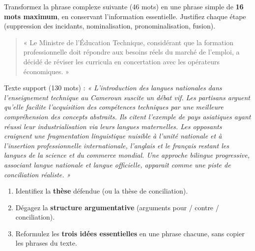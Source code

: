 \documentclass[11pt]{article}
\newcounter{popsec}
\newcounter{popsub}
\newcommand{\courssub}[1]{%
  \stepcounter{popsub}%
  \par\vspace{9pt}\noindent{\popxbold\fontsize{11.5}{13}\selectfont\color{popink}{\color{poporange}\thepopsec.\thepopsub}\hspace{6pt}#1}\par\nopagebreak\vspace{4pt}
}
\begin{document}
\begin{exercice}
Transformez la phrase complexe suivante (46 mots) en une phrase simple de \textbf{16 mots maximum}, en conservant l'information essentielle. Justifiez chaque étape (suppression des incidants, nominalisation, pronominalisation, fusion).

\begin{quote}
« Le Ministre de l'Éducation Technique, considérant que la formation professionnelle doit répondre aux besoins réels du marché de l'emploi, a décidé de réviser les curricula en concertation avec les opérateurs économiques. »
\end{quote}
\end{exercice}

\begin{exercice}
Texte support (130 mots) : \emph{« L'introduction des langues nationales dans l'enseignement technique au Cameroun suscite un débat vif. Les partisans arguent qu'elle facilite l'acquisition des compétences techniques par une meilleure compréhension des concepts abstraits. Ils citent l'exemple de pays asiatiques ayant réussi leur industrialisation via leurs langues maternelles. Les opposants craignent une fragmentation linguistique nuisible à l'unité nationale et à l'insertion professionnelle internationale, l'anglais et le français restant les langues de la science et du commerce mondial. Une approche bilingue progressive, associant langue nationale et langue officielle, apparaît comme une piste de conciliation réaliste. »}

\begin{enumerate}
    \item Identifiez la \textbf{thèse} défendue (ou la thèse de conciliation).
    \item Dégagez la \textbf{structure argumentative} (arguments pour / contre / conciliation).
    \item Reformulez les \textbf{trois idées essentielles} en une phrase chacune, sans copier les phrases du texte.
\end{enumerate}
\end{exercice}

\courssub{Je me prépare au Bac}
\end{document}
